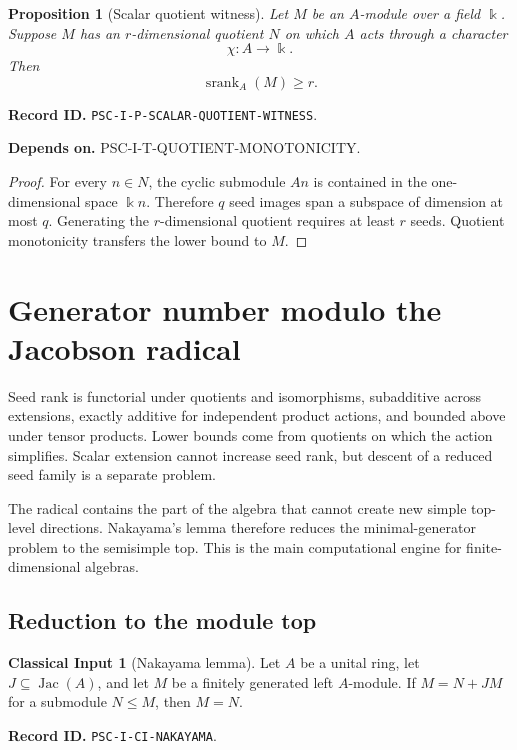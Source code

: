 \documentclass[11pt]{article}
\newtheorem{proposition}[proposition]{Proposition}
\theoremstyle{definition}
\newtheorem{classicalinput}[classicalinput]{Classical Input}
\theoremstyle{remark}
\newcommand{\bbk}{\Bbbk}
\newcommand{\srank}{\operatorname{srank}}
\newcommand{\Jac}{\operatorname{Jac}}
\newcommand{\RecordID}[1]{\par\smallskip\noindent\begingroup\footnotesize\color{PSCGray}\raggedright\textbf{Record ID.} \nolinkurl{#1}.\par\endgroup}
\newcommand{\Depends}[1]{\par\noindent\begingroup\footnotesize\color{PSCGray}\raggedright\textbf{Depends on.} #1\par\endgroup}
\begin{document}
\begin{proposition}[Scalar quotient witness]
\label{prop:scalar-quotient}
Let $M$ be an $A$-module over a field $\bbk$.  Suppose $M$ has an $r$-dimensional quotient $N$ on which $A$ acts through a character
\[
\chi:A\longrightarrow\bbk.
\]
Then
\[
\boxed{\srank_A(M)\geq r.}
\]
\end{proposition}
\RecordID{PSC-I-P-SCALAR-QUOTIENT-WITNESS}
\Depends{PSC-I-T-QUOTIENT-MONOTONICITY.}

\begin{proof}
For every $n\in N$, the cyclic submodule $An$ is contained in the one-dimensional space $\bbk n$.  Therefore $q$ seed images span a subspace of dimension at most $q$.  Generating the $r$-dimensional quotient requires at least $r$ seeds.  Quotient monotonicity transfers the lower bound to $M$.
\end{proof}

\section{Generator number modulo the Jacobson radical}

\begin{sectionrecap}
Seed rank is functorial under quotients and isomorphisms, subadditive across extensions, exactly additive for independent product actions, and bounded above under tensor products.  Lower bounds come from quotients on which the action simplifies.  Scalar extension cannot increase seed rank, but descent of a reduced seed family is a separate problem.
\end{sectionrecap}

\begin{readerroadmap}
The radical contains the part of the algebra that cannot create new simple top-level directions.  Nakayama's lemma therefore reduces the minimal-generator problem to the semisimple top.  This is the main computational engine for finite-dimensional algebras.
\end{readerroadmap}
\subsection{Reduction to the module top}

\begin{classicalinput}[Nakayama lemma]
\label{ci:nakayama}
Let $A$ be a unital ring, let $J\subseteq\Jac(A)$, and let $M$ be a finitely generated left $A$-module.  If $M=N+JM$ for a submodule $N\leq M$, then $M=N$.
\end{classicalinput}
\RecordID{PSC-I-CI-NAKAYAMA}
\end{document}
